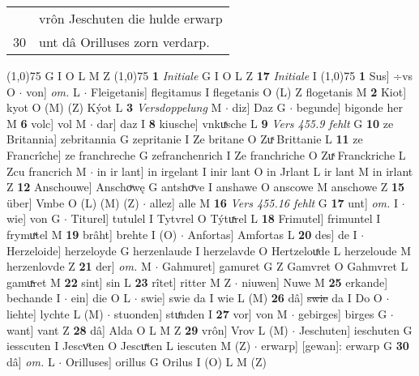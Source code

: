 \documentclass[8pt,a4paper,notitlepage]{article}
\begin{document}
\begin{table}[ht]
\begin{minipage}[t]{0.5\linewidth}
\begin{tabular}{rl}
 & vrôn Jeschuten die hulde erwarp\\ 
30 & unt dâ Orilluses zorn verdarp.\\ 
\end{tabular}
\scriptsize
\line(1,0){75} \newline
G I O L M Z \newline
\line(1,0){75} \newline
\textbf{1} \textit{Initiale} G I O L Z  \textbf{17} \textit{Initiale} I  \newline
\line(1,0){75} \newline
\textbf{1} Sus] ÷vs O  $\cdot$ von] \textit{om.} L  $\cdot$ Fleigetanis] flegitamus I flegetanis O (L) Z flogetanis M \textbf{2} Kiot] kyot O (M) (Z) Kýot L \textbf{3} \textit{Versdoppelung} M   $\cdot$ diz] Daz G  $\cdot$ begunde] bigonde her M \textbf{6} volc] vol M  $\cdot$ dar] daz I \textbf{8} kiusche] vnkuͯsche L \textbf{9} \textit{Vers 455.9 fehlt} G  \textbf{10} ze Britannia] zebritannia G zepritanie I Ze britane O Zuͯ Brittanie L \textbf{11} ze Francrîche] ze franchreche G zefranchenrich I Ze franchriche O Zuͯ Franckriche L Zcu francrich M  $\cdot$ in ir lant] in irgelant I inir lant O in Jrlant L ir lant M in irlant Z \textbf{12} Anschouwe] Anschoͮwę G antshoͮve I anshawe O anscowe M anschowe Z \textbf{15} über] Vmbe O (L) (M) (Z)  $\cdot$ allez] alle M \textbf{16} \textit{Vers 455.16 fehlt} G  \textbf{17} unt] \textit{om.} I  $\cdot$ wie] von G  $\cdot$ Titurel] tutulel I Tytvrel O Týtuͯrel L \textbf{18} Frimutel] frimuntel I frymuͯtel M \textbf{19} brâht] brehte I (O)  $\cdot$ Anfortas] Amfortas L \textbf{20} des] de I  $\cdot$ Herzeloide] herzeloyde G herzenlaude I herzelavde O Hertzelouͯde L herzeloude M herzenlovde Z \textbf{21} der] \textit{om.} M  $\cdot$ Gahmuret] gamuret G Z Gamvret O Gahmvret L gamuͯret M \textbf{22} sint] sin L \textbf{23} rîtet] ritter M Z  $\cdot$ niuwen] Nuwe M \textbf{25} erkande] bechande I  $\cdot$ ein] die O L  $\cdot$ swie] swie da I wie L (M) \textbf{26} dâ] \sout{swie} da I Do O  $\cdot$ liehte] lychte L (M)  $\cdot$ stuonden] stuͤnden I \textbf{27} vor] von M  $\cdot$ gebirges] birges G  $\cdot$ want] vant Z \textbf{28} dâ] Alda O L M Z \textbf{29} vrôn] Vrov L (M)  $\cdot$ Jeschuten] ieschuten G iesscuten I Jescvͦten O Jescuͯten L iescuten M (Z)  $\cdot$ erwarp] [gewan]: erwarp G \textbf{30} dâ] \textit{om.} L  $\cdot$ Orilluses] orillus G Orilus I (O) L M (Z) \newline
\end{minipage}
\hspace{0.5cm}
\begin{minipage}[t]{0.5\linewidth}

\end{minipage}
\end{table}
\end{document}
